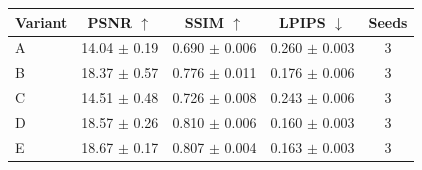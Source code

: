 \begin{tabular}{lcccc}
\toprule
Variant & PSNR $\uparrow$ & SSIM $\uparrow$ & LPIPS $\downarrow$ & Seeds \\
\midrule
A & 14.04 $\pm$ 0.19 & 0.690 $\pm$ 0.006 & 0.260 $\pm$ 0.003 & 3 \\
B & 18.37 $\pm$ 0.57 & 0.776 $\pm$ 0.011 & 0.176 $\pm$ 0.006 & 3 \\
C & 14.51 $\pm$ 0.48 & 0.726 $\pm$ 0.008 & 0.243 $\pm$ 0.006 & 3 \\
D & 18.57 $\pm$ 0.26 & 0.810 $\pm$ 0.006 & 0.160 $\pm$ 0.003 & 3 \\
E & 18.67 $\pm$ 0.17 & 0.807 $\pm$ 0.004 & 0.163 $\pm$ 0.003 & 3 \\
\bottomrule
\end{tabular}
